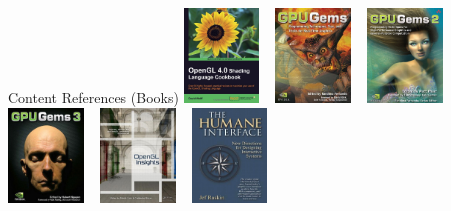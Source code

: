 \begin{frame}{Content References (Books)}
	\includegraphics[width=0.15\textwidth]{books/oglshadingcook}	
	~
	\includegraphics[width=0.15\textwidth]{books/gems1}	
	~
	\includegraphics[width=0.15\textwidth]{books/gems2}	
	~
	\includegraphics[width=0.15\textwidth]{books/gems3}	
	~
	\includegraphics[width=0.15\textwidth]{books/oglinsights}	
	~
	\includegraphics[width=0.15\textwidth]{books/humaninterface}
	
\end{frame}


